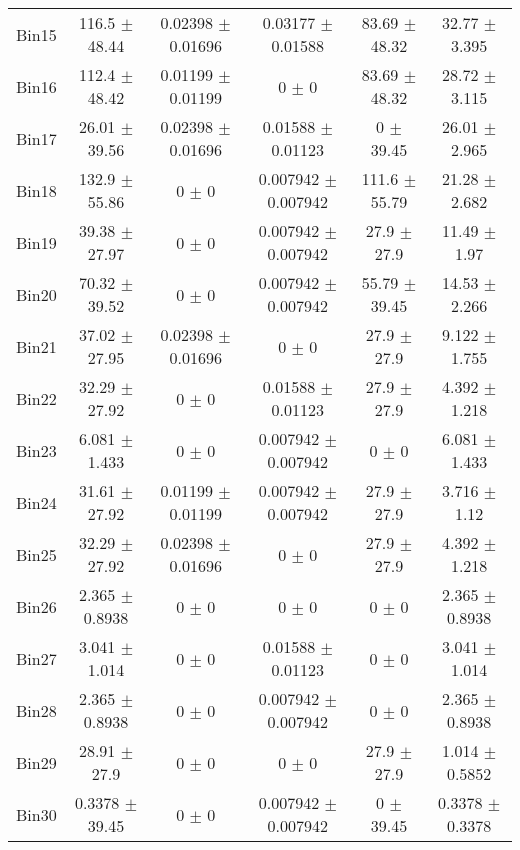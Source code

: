 \begin{tabular}{@{\extracolsep{4pt}}lccccc@{}}
     Bin15 & 116.5 $\pm$ 48.44 & 0.02398 $\pm$ 0.01696 & 0.03177 $\pm$ 0.01588 & 83.69 $\pm$ 48.32 & 32.77 $\pm$ 3.395 \\ 
     Bin16 & 112.4 $\pm$ 48.42 & 0.01199 $\pm$ 0.01199 & 0 $\pm$ 0 & 83.69 $\pm$ 48.32 & 28.72 $\pm$ 3.115 \\ 
     Bin17 & 26.01 $\pm$ 39.56 & 0.02398 $\pm$ 0.01696 & 0.01588 $\pm$ 0.01123 & 0 $\pm$ 39.45 & 26.01 $\pm$ 2.965 \\ 
     Bin18 & 132.9 $\pm$ 55.86 & 0 $\pm$ 0 & 0.007942 $\pm$ 0.007942 & 111.6 $\pm$ 55.79 & 21.28 $\pm$ 2.682 \\ 
     Bin19 & 39.38 $\pm$ 27.97 & 0 $\pm$ 0 & 0.007942 $\pm$ 0.007942 & 27.9 $\pm$ 27.9 & 11.49 $\pm$ 1.97 \\ 
     Bin20 & 70.32 $\pm$ 39.52 & 0 $\pm$ 0 & 0.007942 $\pm$ 0.007942 & 55.79 $\pm$ 39.45 & 14.53 $\pm$ 2.266 \\ 
     Bin21 & 37.02 $\pm$ 27.95 & 0.02398 $\pm$ 0.01696 & 0 $\pm$ 0 & 27.9 $\pm$ 27.9 & 9.122 $\pm$ 1.755 \\ 
     Bin22 & 32.29 $\pm$ 27.92 & 0 $\pm$ 0 & 0.01588 $\pm$ 0.01123 & 27.9 $\pm$ 27.9 & 4.392 $\pm$ 1.218 \\ 
     Bin23 & 6.081 $\pm$ 1.433 & 0 $\pm$ 0 & 0.007942 $\pm$ 0.007942 & 0 $\pm$ 0 & 6.081 $\pm$ 1.433 \\ 
     Bin24 & 31.61 $\pm$ 27.92 & 0.01199 $\pm$ 0.01199 & 0.007942 $\pm$ 0.007942 & 27.9 $\pm$ 27.9 & 3.716 $\pm$ 1.12 \\ 
     Bin25 & 32.29 $\pm$ 27.92 & 0.02398 $\pm$ 0.01696 & 0 $\pm$ 0 & 27.9 $\pm$ 27.9 & 4.392 $\pm$ 1.218 \\ 
     Bin26 & 2.365 $\pm$ 0.8938 & 0 $\pm$ 0 & 0 $\pm$ 0 & 0 $\pm$ 0 & 2.365 $\pm$ 0.8938 \\ 
     Bin27 & 3.041 $\pm$ 1.014 & 0 $\pm$ 0 & 0.01588 $\pm$ 0.01123 & 0 $\pm$ 0 & 3.041 $\pm$ 1.014 \\ 
     Bin28 & 2.365 $\pm$ 0.8938 & 0 $\pm$ 0 & 0.007942 $\pm$ 0.007942 & 0 $\pm$ 0 & 2.365 $\pm$ 0.8938 \\ 
     Bin29 & 28.91 $\pm$ 27.9 & 0 $\pm$ 0 & 0 $\pm$ 0 & 27.9 $\pm$ 27.9 & 1.014 $\pm$ 0.5852 \\ 
     Bin30 & 0.3378 $\pm$ 39.45 & 0 $\pm$ 0 & 0.007942 $\pm$ 0.007942 & 0 $\pm$ 39.45 & 0.3378 $\pm$ 0.3378 \\ 
\hline\hline
  \end{tabular}
